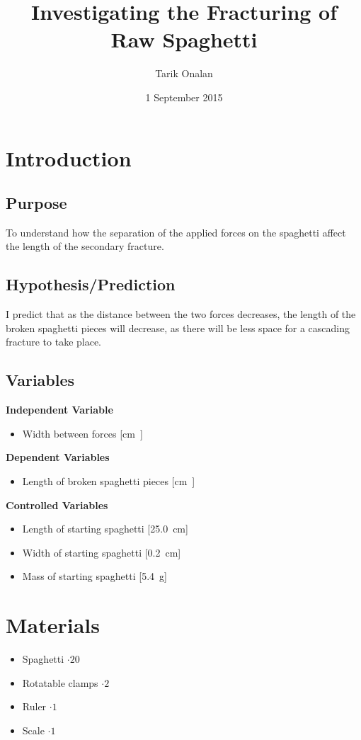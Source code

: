 \documentclass[a4paper]{article}
\title{Investigating the Fracturing of Raw Spaghetti}
\date{1 September 2015}
\author{Tarik Onalan}
\begin{document}
    \maketitle
    \section{Introduction}
        \subsection{Purpose}
            To understand how the separation of the applied forces on the spaghetti affect
            the length of the secondary fracture.
        \subsection{Hypothesis/Prediction}
            I predict that as the distance between the two forces decreases, the length of
            the broken spaghetti pieces will decrease, as there will be less space for a
            cascading fracture to take place.
        \subsection{Variables}
            \textbf{Independent Variable}
            \begin{itemize}
                \item Width between forces [\si\cm]
            \end{itemize}
            \textbf{Dependent Variables}
            \begin{itemize}
                \item Length of broken spaghetti pieces [\si\cm]
            \end{itemize}
            \textbf{Controlled Variables}
            \begin{itemize}
                \item Length of starting spaghetti [\SI{25.0}{\cm}]
                \item Width of starting spaghetti [\SI{0.2}{\cm}]
                \item Mass of starting spaghetti [\SI{5.4}{\g}]
            \end{itemize}
    \section{Materials}
        \begin{itemize}
            \item Spaghetti $\cdot 20$
            \item Rotatable clamps $\cdot 2$
            \item Ruler $\cdot 1$
            \item Scale $\cdot 1$
        \end{itemize}
\end{document}
